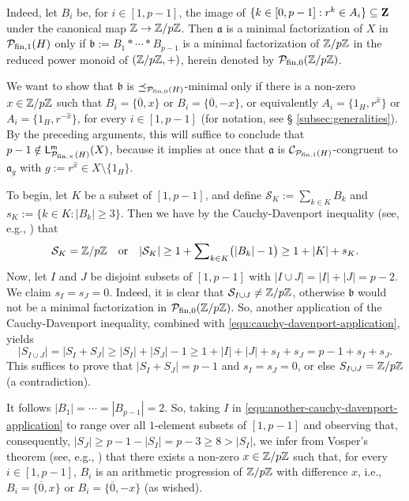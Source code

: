 \begin{eg}
	Indeed, let $B_i$ be, for $i \in [ 1, p-1 ]$, the image of $\{k \in [ 0, p-1 ]: r^k \in A_i\} \subseteq \bf Z$ under the canonical map $\mathbb{Z} \to \mathbb{Z}/p\mathbb{Z}$. Then $\mathfrak a$ is a minimal factorization of $X$ in $\mathcal P_{\textrm{fin},1}(H)$ only if $\mathfrak b := B_1 \ast \cdots \ast B_{p-1}$ is a minimal factorization of $\mathbb{Z}/p\mathbb{Z}$ in the reduced power monoid of $(\mathbb{Z}/p\mathbb{Z}, +)$, herein denoted by $\mathcal P_{\textrm{fin},0}(\mathbb{Z}/p\mathbb{Z})$.
	
	We want to show that $\mathfrak b$ is $\preceq_{\mathcal P_{\textrm{fin},0}(H)}$-minimal only if there is a non-zero $x \in \mathbb{Z}/p\mathbb{Z}$ such that $B_i = \{\overline{0}, x\}$ or $B_i = \{\overline{0}, -x\}$, or equivalently $A_i = \{1_H, r^{\hat{x}}\}$ or $A_i = \{1_H, r^{-\hat{x}}\}$, for every $i \in [ 1, p-1 ]$ (for notation, see \S{ }\ref{subsec:generalities}). By the preceding arguments, this will suffice to conclude that $p-1 \notin \mathsf L^{\mathsf{m}}_{\mathcal P_{\textrm{fin}, \times}(H)}(X)$, because it implies at once that $\mathfrak a$ is $\mathcal C_{\mathcal P_{\textrm{fin}, 1}(H)}$-congruent to $\mathfrak a_g$ with $g := r^{\hat{x}} \in X \setminus \{1_H\}$.
	
	To begin, let $K$ be a subset of $[ 1, p-1 ]$, and define $\mathcal{S}_K := \sum_{k \in K} B_k$ and $s_K := \{k \in K: |B_k| \ge 3\}$. Then we have by the Cauchy-Davenport inequality (see, e.g., \cite[Theorem 6.2]{grynkiewicz13}) that
	\begin{equation}\label{equ:cauchy-davenport-application}
	\mathcal{S}_K = \mathbb{Z}/p\mathbb{Z} 
	\quad\text{or}\quad
	|\mathcal{S}_K| \ge 1 + {\sum}_{k \in K} \bigl(|B_k| - 1\bigr) \ge 1 + |K| + s_K.
	\end{equation}
	Now, let $I$ and $J$ be disjoint subsets of $[ 1, p-1 ]$ with $|I \cup J| = |I| + |J| = p-2$. We claim $s_I = s_J = 0$. Indeed, it is clear that $\mathcal{S}_{I \cup J} \ne \mathbb{Z}/p\mathbb{Z}$, otherwise $\mathfrak b$ would not be a minimal factorization in $\mathcal P_{\textrm{fin},0}(\mathbb{Z}/p\mathbb{Z})$. So, another application of the Cauchy-Davenport inequality, combined with \eqref{equ:cauchy-davenport-application}, yields
	\begin{equation}\label{equ:another-cauchy-davenport-application}
	|S_{I \cup J}| = |S_I + S_J| \ge |S_I| + |S_J| - 1 \ge 1 + |I| + |J| + s_I + s_J = p-1 + s_I + s_J.
	\end{equation}
	This suffices to prove that $|S_I + S_J| = p-1$ and $s_I = s_J = 0$, or else $S_{I \cup J} = \mathbb{Z}/p\mathbb{Z}$ (a contradiction). 
	
	It follows $|B_1| = \cdots = |B_{p-1}| = 2$. So, taking $I$ in \eqref{equ:another-cauchy-davenport-application} to range over all $1$-element subsets of $[ 1, p-1 ]$ and observing that, consequently, $|S_J| \ge p-1-|S_I| = p-3 \ge 8 > |S_I|$, we infer from Vosper's theorem (see, e.g., \cite[Theorem 8.1]{grynkiewicz13}) that there exists a non-zero $x \in \mathbb{Z}/p\mathbb{Z}$ such that, for every $i \in [ 1, p-1 ]$, $B_i$ is an arithmetic progression of $\mathbb{Z}/p\mathbb{Z}$ with difference $x$, i.e., $B_i = \{\overline{0}, x\}$ or $B_i = \{\overline{0}, -x\}$ (as wished).
\end{eg}



